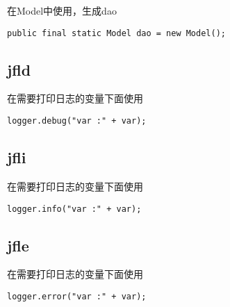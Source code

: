 \documentclass{scrartcl}
\begin{document}
   在Model中使用，生成dao


\begin{verbatim}
public final static Model dao = new Model();
\end{verbatim}
\subsection{jfld}
\label{sec-6-3}


   在需要打印日志的变量下面使用

\begin{verbatim}
logger.debug("var :" + var);
\end{verbatim}
\subsection{jfli}
\label{sec-6-4}

   在需要打印日志的变量下面使用

\begin{verbatim}
logger.info("var :" + var);
\end{verbatim}
\subsection{jfle}
\label{sec-6-5}

   在需要打印日志的变量下面使用

\begin{verbatim}
logger.error("var :" + var);
\end{verbatim}
   
\end{document}
